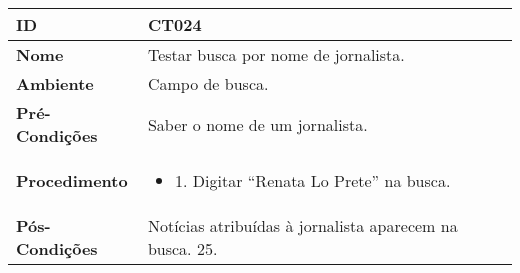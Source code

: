 \documentclass[12pt]{article}
\begin{document}
\vspace{0.5cm}

\renewcommand{\arraystretch}{1.5}
\begin{tabular}{|>{\bfseries}p{4cm}|p{10cm}|}
    \hline
    ID & CT024 \\
    \hline
    Nome & Testar busca por nome de jornalista. \\
    \hline
    Ambiente & Campo de busca. \\
    \hline
    Pré-Condições & Saber o nome de um jornalista. \\
    \hline
    Procedimento & 
    \begin{itemize}
\item 1. Digitar “Renata Lo Prete” na busca.
    \end{itemize} \\
    \hline
    Pós-Condições & Notícias atribuídas à jornalista aparecem na busca. 25. \\
    \hline
\end{tabular}

\vspace{1cm}
\end{document}
